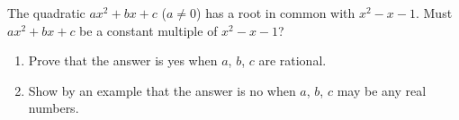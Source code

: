 The quadratic $ax^2+bx+c$ ($a\ne0$) has a root in common with $x^2-x-1$. Must $ax^2+bx+c$ be a constant multiple of $x^2-x-1$?
\begin{enumerate}
\item[(a)] Prove that the answer is yes when $a$, $b$, $c$ are rational.
\item[(b)] Show by an example that the answer is no when $a$, $b$, $c$ may be any real numbers.
\end{enumerate}
